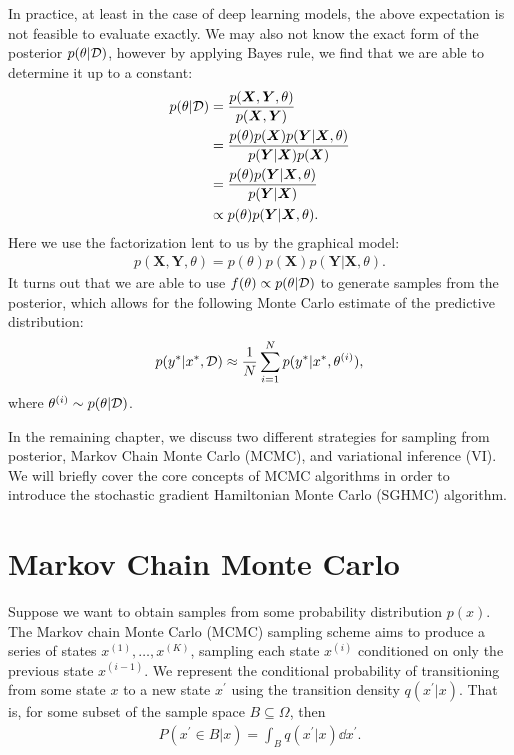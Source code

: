 In practice, at least in the case of deep learning models, the above expectation is not feasible to evaluate exactly.
We may also not know the exact form of the posterior $p(\theta|\mathcal{D})$, however by applying Bayes rule, we find that we are able to determine it up to a constant:
\begin{equation} \label{eq:posterior}
    \begin{aligned}
        p(\theta | \mathcal{D}) 
        &= \frac{p(\bm X , \bm Y, \theta)}{p(\bm{X}, \bm{Y})}\\
        &= \frac{p(\theta) p(\bm X) p(\bm Y | \bm X, \theta)}{p(\bm{Y}|\bm{X})p(\bm{X})} \\
        &= \frac{p(\theta) p(\bm Y | \bm X, \theta)}{p(\bm{Y}|\bm{X})} \\
        &\propto p(\theta) p(\bm Y | \bm X, \theta).
    \end{aligned}
\end{equation}
Here we use the factorization lent to us by the graphical model:
\begin{align}
    p(\bm X, \bm Y, \theta) = p(\theta) p(\bm X) p(\bm Y | \bm X, \theta).
\end{align}
It turns out that we are able to use $f(\theta) \propto p(\theta | \mathcal{D})$ to generate samples from the posterior, which allows for the following Monte Carlo estimate of the predictive distribution:
\begin{align}
    p(y^\ast | x^\ast, \mathcal{D})  \approx \frac{1}{N} \sum_{i=1}^N p(y^\ast | x^\ast, \theta^{(i)}),
\end{align}
where $\theta^{(i)}\sim p(\theta | \mathcal{D})$.

In the remaining chapter, we discuss two different strategies for sampling from posterior, Markov Chain Monte Carlo (MCMC), and variational inference (VI).
We will briefly cover the core concepts of MCMC algorithms in order to introduce the stochastic gradient Hamiltonian Monte Carlo (SGHMC) algorithm.

\section{Markov Chain Monte Carlo}

Suppose we want to obtain samples from some probability distribution $p(x)$.
The Markov chain Monte Carlo (MCMC) sampling scheme aims to produce a series of states $x^{(1)},\dots,x^{(K)}$, sampling each state $x^{(i)}$ conditioned on only the previous state $x^{(i-1)}$. 
We represent the conditional probability of transitioning from some state $x$ to a new state $x^\prime$ using the transition density $q(x^\prime | x)$.
That is, for some subset of the sample space $B\subseteq \Omega$, then 
\begin{align}    
    P(x^\prime \in B|x)=\int_{B}q(x^\prime | x)\dd{x^\prime}.
\end{align}

